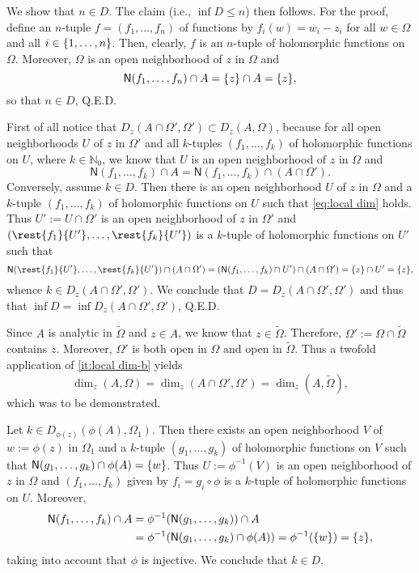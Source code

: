 \documentclass[a4paper]{amsart}
\newcommand{\N}{\mathbb{N}}
\newcommand{\Zero}[1]{\mathsf{N}(#1)}
\theoremstyle{remark}
\numberwithin{equation}{question}
\DeclarePairedDelimiter\set{\{}{\}}
\begin{document}
\begin{solution}%
\begin{solenum}
\item We show that $n \in D$. The claim (i.e., $\inf D \le n$) then follows. For the proof, define an $n$-tuple $f = (f_1,\dots,f_n)$ of functions by $f_i(w) = w_i - z_i$ for all $w \in \Omega$ and all $i \in \set{1,\dots,n}$. Then, clearly, $f$ is an $n$-tuple of holomorphic functions on $\Omega$. Moreover, $\Omega$ is an open neighborhood of $z$ in $\Omega$ and
\[
\Zero{f_1,\dots,f_n} \cap A = \set z \cap A = \set z,
\]
so that $n \in D$, Q.E.D.

\item First of all notice that $D_z(A \cap \Omega',\Omega') \subset D_z(A,\Omega)$, because for all open neighborhoods $U$ of $z$ in $\Omega'$ and all $k$-tuples $(f_1,\dots,f_k)$ of holomorphic functions on $U$, where $k \in \N_0$, we know that $U$ is an open neighborhood of $z$ in $\Omega$ and
\[
\Zero{f_1,\dots,f_k} \cap A = \Zero{f_1,\dots,f_k} \cap (A \cap \Omega').
\]
Conversely, assume $k \in D$. Then there is an open neighborhood $U$ of $z$ in $\Omega$ and a $k$-tuple $(f_1,\dots,f_k)$ of holomorphic functions on $U$ such that \cref{eq:local dim} holds. Thus $U' := U \cap \Omega'$ is an open neighborhood of $z$ in $\Omega'$ and $(\rest{f_1}{U'}, \dots, \rest{f_k}{U'})$ is a $k$-tuple of holomorphic functions on $U'$ such that
\[
\Zero{\rest{f_1}{U'}, \dots, \rest{f_k}{U'}} \cap (A \cap \Omega') = (\Zero{f_1,\dots,f_k} \cap U') \cap (A \cap \Omega') = \set z \cap U' = \set z,
\]
whence $k \in D_z(A \cap \Omega',\Omega')$. We conclude that $D = D_z(A \cap \Omega',\Omega')$ and thus that $\inf D = \inf D_z(A \cap \Omega',\Omega')$, Q.E.D.

\item Since $A$ is analytic in $\tilde\Omega$ and $z \in A$, we know that $z \in \tilde\Omega$. Therefore, $\Omega' := \Omega \cap \tilde\Omega$ contains $z$. Moreover, $\Omega'$ is both open in $\Omega$ and open in $\tilde\Omega$. Thus a twofold application of \cref{it:local dim-b} yields
\[
\dim_z(A,\Omega) = \dim_z(A \cap \Omega',\Omega') = \dim_z(A,\tilde\Omega),
\]
which was to be demonstrated.

\item Let $k \in D_{\phi(z)}(\phi(A),\Omega_1)$. Then there exists an open neighborhood $V$ of $w := \phi(z)$ in $\Omega_1$ and a $k$-tuple $(g_1,\dots,g_k)$ of holomorphic functions on $V$ such that $\Zero{g_1,\dots,g_k} \cap \phi(A) = \set w$. Thus $U := \phi^{-1}(V)$ is an open neighborhood of $z$ in $\Omega$ and $(f_1,\dots,f_k)$ given by $f_i = g_i \circ \phi$ is a $k$-tuple of holomorphic functions on $U$. Moreover,
\begin{align*}
\Zero{f_1,\dots,f_k} \cap A &= \phi^{-1}(\Zero{g_1,\dots,g_k}) \cap A \\ &= \phi^{-1}(\Zero{g_1,\dots,g_k} \cap \phi(A)) = \phi^{-1}(\set w) = \set z,
\end{align*}
taking into account that $\phi$ is injective. We conclude that $k \in D$.


\end{solenum}
\end{solution}
\end{document}
